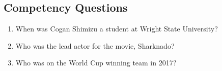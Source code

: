 \subsection{Competency Questions}
\label{cqs:AgentRole}
\begin{enumerate}[CQ1.]
\item When was Cogan Shimizu a student at Wright State University?
\item Who was the lead actor for the movie, Sharknado?
\item Who was on the World Cup winning team in 2017?
\end{enumerate}

\newpage
